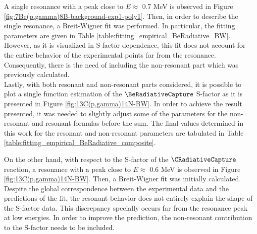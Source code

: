 \documentclass[openany]{book}
\begin{document}


A single resonance with a peak close to $E \approx$ 0.7 MeV is observed in Figure \ref{fig:7Be(p,gamma)8B-background-exp1-poly1}. Then, in order to describe the single resonance, a Breit-Wigner fit was performed. In particular, the fitting parameters are given in Table \ref{table:fitting_empirical_BeRadiative_BW}. However, as it is visualized in S-factor dependence, this fit does not account for the entire behavior of the experimental points far from the resonance. Consequently, there is the need of including the non-resonant part which was previously calculated. \\

Lastly, with both resonant and non-resonant parts considered, it is possible to plot a single function estimation of the $\BeRadiativeCapture$ S-factor as it is presented in Figure \ref{fig:13C(p,gamma)14N-BW}. In order to achieve the result presented, it was needed to slightly adjust some of the parameters for the non-resonant and resonant formulas before the sum. The final values determined in this work for the resonant and non-resonant parameters are tabulated in Table \ref{table:fitting_empirical_BeRadiative_composite}. \\

 



On the other hand, with respect to the S-factor of the $\CRadiativeCapture$ reaction, a resonance with a peak close to $E\approx$  0.6 MeV is observed in Figure \ref{fig:13C(p,gamma)14N-BW}. Then, a Breit-Wigner fit was initially calculated. Despite the global correspondence between the experimental data and the predictions of the fit, the resonant behavior does not entirely explain the shape of the S-factor data. This discrepancy specially  occurs far from the resonance peak at low energies. In order to improve the prediction, the non-resonant contribution to the S-factor needs to be included. \\
\end{document}
